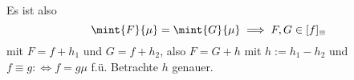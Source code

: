 \documentclass[../WiSe22ANA3.tex]{subfiles}
\begin{document}
		
		
		Es ist also 
		$$\mint{F}{\mu}=\mint{G}{\mu}\implies F,G\in[f]_{\equiv}$$
		mit $F=f + h_1$ und $G=f+h_2$, also $F=G+h$ mit $h:=h_1-h_2$ und $f\equiv g:\Longleftrightarrow f=g\mu$ f.ü. Betrachte $h$ genauer.
\end{document}
